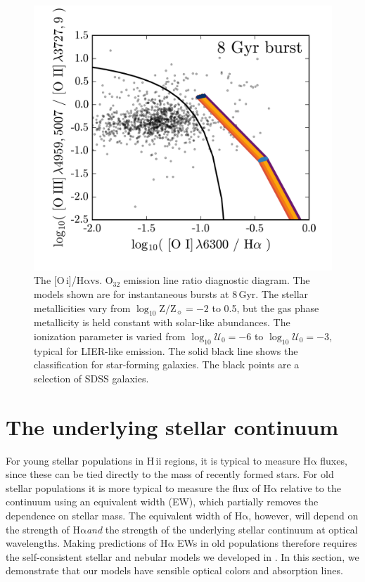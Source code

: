 \documentclass[preprint2]{aastex62}
\newcommand\vs{\ensuremath{\mathrm{vs.}}\xspace}
\newcommand{\hii}{H\,{\sc ii}\xspace}
\newcommand{\oi}{[O\,{\sc i}]\xspace}
\newcommand{\ha}{\ensuremath{\mathrm{H\alpha}}\xspace}
\newcommand{\logten}{\ensuremath{\log_{10}}}
\newcommand{\logZeq}[1]{\ensuremath{\logten \mathrm{Z}/\mathrm{Z}_{\sun} = #1}}
\newcommand{\logUeq}[1]{\ensuremath{\logten \mathcal{U}_0 = #1}}
\newcommand{\Gyr}{$\,$Gyr\xspace}
\begin{document}
\begin{figure}
  \begin{center}
    \includegraphics[width=\linewidth]{figs/f8.png}
    \caption{The \oi/\ha \vs O$_{32}$ emission line ratio diagnostic diagram. The models shown are for instantaneous bursts at 8\Gyr. The stellar metallicities vary from \logZeq{-2} to 0.5, but the gas phase metallicity is held constant with solar-like abundances. The ionization parameter is varied from \logUeq{-6} to \logUeq{-3}, typical for LIER-like emission. The solid black line shows the \citet{Kewley+2006} classification for star-forming galaxies. The black points are a selection of SDSS galaxies.}
    \label{fig:BPT3}
  \end{center}
\end{figure}

\section{The underlying stellar continuum} \label{sec:stars:continuum}

For young stellar populations in \hii regions, it is typical to measure \ha fluxes, since these can be tied directly to the mass of recently formed stars. For old stellar populations it is more typical to measure the flux of \ha relative to the continuum using an equivalent width (EW), which partially removes the dependence on stellar mass. The equivalent width of \ha, however, will depend on the strength of \ha \emph{and} the strength of the underlying stellar continuum at optical wavelengths. Making predictions of \ha EWs in old populations therefore requires the self-consistent stellar and nebular models we developed in \citet{Byler+2017}. In this section, we demonstrate that our models have sensible optical colors and absorption lines.
\end{document}
